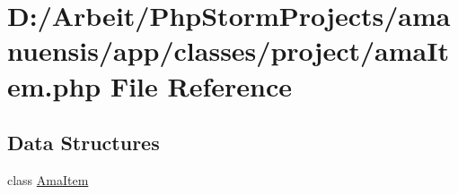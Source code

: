 \hypertarget{ama_item_8php}{}\section{D\+:/\+Arbeit/\+Php\+Storm\+Projects/amanuensis/app/classes/project/ama\+Item.php File Reference}
\label{ama_item_8php}
\subsection*{Data Structures}
\begin{DoxyCompactItemize}
\item 
class \hyperlink{class_ama_item}{Ama\+Item}
\end{DoxyCompactItemize}

